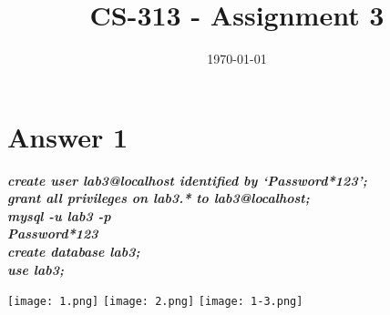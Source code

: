 \documentclass[14pt]{extarticle}
\title{CS-313 - Assignment 3}
\author{
\color{blue}{Monu Kumar Soyal - 200010029}
}
\date{\today}
\begin{document}
\maketitle
\hline

\section*{Answer 1}
\textbf{\textit{create user lab3@localhost identified by `Password*123';\\
grant all privileges on lab3.* to lab3@localhost;\\
mysql -u lab3 -p\\
Password*123\\
create database lab3;\\
use lab3;
}}

\begin{center}
    \texttt{[image: 1.png]}
    \texttt{[image: 2.png]}
    \texttt{[image: 1-3.png]}
\end{center}
\end{document}
